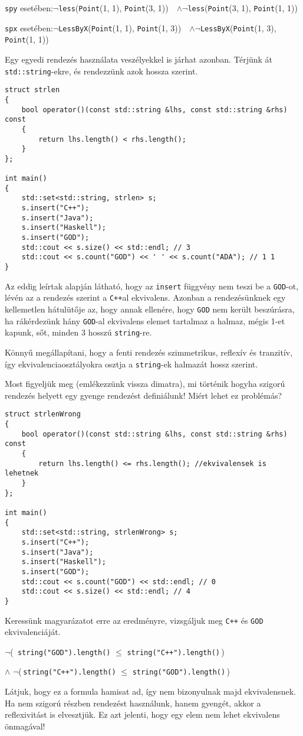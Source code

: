 \documentclass[a4paper,11.5pt,table]{article}
\begin{document}
	\begin{center}	
		\texttt{spy} esetében:\quad  $\neg$\texttt{less}\big(\texttt{Point}(1, 1), \texttt{Point}(3, 1)\big) \,\, $\wedge$\quad $\neg$\texttt{less}\big(\texttt{Point}(3, 1), \texttt{Point}(1, 1)\big)
		
		\texttt{spx} esetében:\quad  $\neg$\texttt{LessByX}\big(\texttt{Point}(1, 1), \texttt{Point}(1, 3)\big) \,\, $\wedge$\quad $\neg$\texttt{LessByX}\big(\texttt{Point}(1, 3), \texttt{Point}(1, 1)\big)
	\end{center}
	Egy egyedi rendezés használata veszélyekkel is járhat azonban. Térjünk át \texttt{std::string}-ekre, és rendezzünk azok hossza szerint.
	\begin{lstlisting}
struct strlen
{
	bool operator()(const std::string &lhs, const std::string &rhs) const
	{
		return lhs.length() < rhs.length();
	}
};

int main()
{
	std::set<std::string, strlen> s;
	s.insert("C++");
	s.insert("Java");
	s.insert("Haskell");
	s.insert("GOD");
	std::cout << s.size() << std::endl; // 3
	std::cout << s.count("GOD") << ' ' << s.count("ADA"); // 1 1
}
\end{lstlisting}
	Az eddig leírtak alapján látható, hogy az \texttt{insert} függvény nem teszi be a \texttt{GOD}-ot, lévén az a rendezés szerint a \texttt{C++}al ekvivalens. Azonban a rendezésünknek egy kellemetlen hátulütője az, hogy annak ellenére, hogy \texttt{GOD} nem került beszúrásra, ha rákérdezünk hány \texttt{GOD}-al ekvivalens elemet tartalmaz a halmaz, mégis 1-et kapunk, sőt, minden 3 hosszú \texttt{string}-re.
	\begin{note}
		Könnyű megállapítani, hogy a fenti rendezés szimmetrikus, reflexív és tranzitív, így ekvivalenciaosztályokra osztja a \texttt{string}-ek halmazát hossz szerint.
	\end{note}
	Most figyeljük meg (emlékezzünk vissza dimatra), mi történik hogyha szigorú rendezés helyett egy gyenge rendezést definiálunk! Miért lehet ez problémás?
\begin{lstlisting}
struct strlenWrong
{
	bool operator()(const std::string &lhs, const std::string &rhs) const
	{
		return lhs.length() <= rhs.length(); //ekvivalensek is lehetnek
	}
};

int main()
{
	std::set<std::string, strlenWrong> s;
	s.insert("C++");
	s.insert("Java");
	s.insert("Haskell");
	s.insert("GOD");
	std::cout << s.count("GOD") << std::endl; // 0
	std::cout << s.size() << std::endl; // 4
}
\end{lstlisting}
	Keressünk magyarázatot erre az eredményre, vizsgáljuk meg \texttt{C++} és \texttt{GOD} ekvivalenciáját.
	\begin{center}
		$\neg$\big(\texttt{\,string("GOD").length()} $\leq$ \texttt{string("C++").length()}\,\big)
		
		$\wedge$ $\neg$\big(\,\texttt{string("C++").length()} $\leq$ \texttt{string("GOD").length()}\,\big)
	\end{center}
	Látjuk, hogy ez a formula hamisat ad, így nem bizonyulnak majd ekvivalensnek. Ha nem szigorú részben rendezést használunk, hanem gyengét, akkor a reflexivitást is elvesztjük. Ez azt jelenti, hogy egy elem nem lehet ekvivalens önmagával!
	
\end{document}

